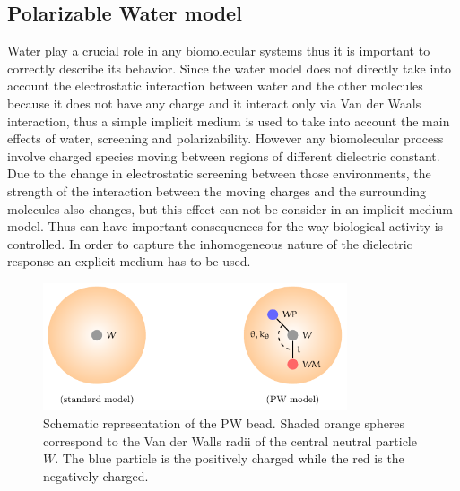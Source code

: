 
\subsection{Polarizable Water model}
\label{sec:pw}
Water play a crucial role in any biomolecular systems thus it is important to correctly describe its behavior. 
Since the \martini water model does not directly take into account the electrostatic interaction between water and the other molecules because it does not have any charge and it interact only via Van der Waals interaction, thus a simple implicit medium is used to take into account the main effects of water, screening and polarizability. However any biomolecular process involve charged species moving between regions of different dielectric constant. Due to the change in electrostatic screening between those environments, the strength of the interaction between the moving charges and the surrounding molecules also changes, but this effect can not be consider in an implicit medium model. Thus can have important consequences for the way biological activity is controlled. In order to capture the inhomogeneous nature of the dielectric response an explicit medium has to be used. 
\begin{figure}[!ht]
	\centering
	\includegraphics[width=0.8\textwidth]{./img/PWModel/PWModel}
	\caption{Schematic representation of the \acs{PW} bead. Shaded orange spheres correspond to the Van der Walls radii of the central neutral particle $W$. The blue particle is the positively charged while the red is the negatively charged.}
	\label{fig:PW}
\end{figure}

